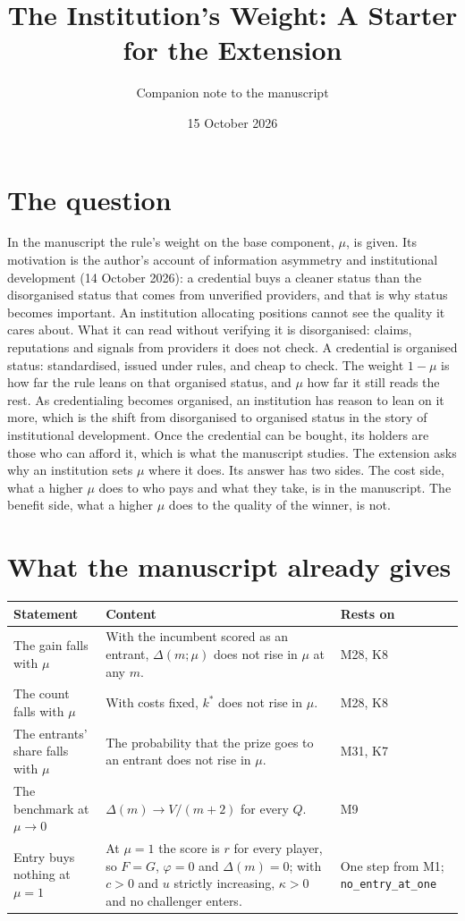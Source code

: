 \documentclass[11pt]{article}
\title{The Institution's Weight: A Starter for the Extension}
\author{Companion note to the manuscript}
\date{15 October 2026}
\begin{document}
\maketitle

\section{The question}

In the manuscript the rule's weight on the base component, $\mu$, is given.
Its motivation is the author's account of information asymmetry and
institutional development (14 October 2026): a credential buys a cleaner
status than the disorganised status that comes from unverified providers, and
that is why status becomes important. An institution allocating positions
cannot see the quality it cares about. What it can read without verifying it is
disorganised: claims, reputations and signals from providers it does not check.
A credential is organised status: standardised, issued under rules, and cheap to
check. The weight $1-\mu$ is how far the rule leans on that organised status,
and $\mu$ how far it still reads the rest. As credentialing becomes organised,
an institution has reason to lean on it more, which is the shift from
disorganised to organised status in the story of institutional development.
Once the credential can be bought, its holders are those who can afford it,
which is what the manuscript studies. The extension asks why an institution
sets $\mu$ where it does. Its answer has two sides. The cost side,
what a higher $\mu$ does to who pays and what they take, is in the manuscript.
The benefit side, what a higher $\mu$ does to the quality of the winner, is not.

\section{What the manuscript already gives}

\begin{center}
\small
\begin{tabular}{@{}P{4.2cm}P{7.8cm}P{3.2cm}@{}}
\toprule
\textbf{Statement} & \textbf{Content} & \textbf{Rests on} \\
\midrule
The gain falls with $\mu$ & With the incumbent scored as an entrant,
  $\Delta(m;\mu)$ does not rise in $\mu$ at any $m$. & M28, K8 \\ \addlinespace
The count falls with $\mu$ & With costs fixed, $k^*$ does not rise in $\mu$. &
  M28, K8 \\ \addlinespace
The entrants' share falls with $\mu$ & The probability that the prize goes to an
  entrant does not rise in $\mu$. & M31, K7 \\ \addlinespace
The benchmark at $\mu\to0$ & $\Delta(m)\to V/(m+2)$ for every $Q$. & M9 \\
  \addlinespace
Entry buys nothing at $\mu=1$ & At $\mu=1$ the score is $r$ for every player,
  so $F=G$, $\varphi=0$ and $\Delta(m)=0$; with $c>0$ and $u$ strictly
  increasing, $\kappa>0$ and no challenger enters. & One step from M1;
  \texttt{no\_entry\_at\_one} \\
\bottomrule
\end{tabular}
\end{center}
\end{document}
